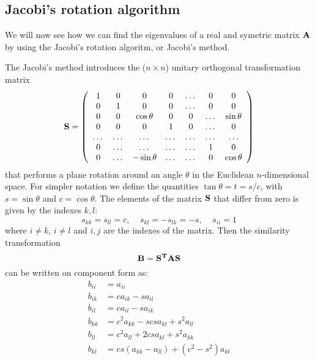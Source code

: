 \documentclass[11pt,a4wide]{article}
\begin{document}
\subsection{Jacobi's rotation algorithm} \label{sec:jacobi}
We will now see how we can find the eigenvalues of a real and symetric matrix $\bf A$ by using the Jacobi's rotation algoritm, or Jacobi's method.

The Jacobi's method introduces the ($n\times n$) unitary orthogonal transformation matrix 
\begin{equation}
    \bf S = \left( \begin{array}{ccccccc} 1 & 0 & 0   & 0    & \dots  &0     & 0 \\
                                0  & 1 & 0 & 0    & \dots  &0     &0 \\
                                0   & 0 & \cos \theta & 0  &0       &\dots & \sin \theta\\
                                0   & 0 & 0  & 1  &0       &\dots & 0\\
                                \dots  & \dots & \dots & \dots  &\dots      &\dots & \dots\\
                                0   & \dots & \dots & \dots  &\dots       &1 & 0\\
                                0   & \dots & -\sin \theta & \dots  &\dots       &0 & \cos \theta

             \end{array} \right) 
      \label{eq:sematrix}
\end{equation}
that performs a plane rotation around an angle $\theta$ in the Euclidean $n$-dimensional space. For simpler notation we define the quantities $\tan\theta = t= s/c$, with $s=\sin\theta$ and $c=\cos\theta$. The elements of the matrix $\bf S$ that differ from zero is given by the indexes $k,l$:
\[
s_{kk} = s_{ll} = c, \;\;\;\;  s_{kl} = -s_{lk} = -s,\;\; \;\;  s_{ii} = 1
\]
where $i\neq k$, $i\neq l$ and $i,j$ are the indexes of the matrix. Then the similarity transformation 
\[
\bf B = \bf {S^T AS}
\]
can be written on component form as:
\begin{align*}
b_{ii} &= a_{ii}\\
b_{ik} &= ca_{ik} - sa_{il} \\
b_{il} &= ca_{il} - sa_{ik} \\
b_{kk} &= c^2a_{kk} - s csa_{kl} + s^2 a_{ll} \\
b_{ll} &= c^2a_{ll} + 2csa_{kl} + s^2a_{kk} \\
b_{kl} &= cs(a_{kk} - a_{ll}) + (c^2 - s^2)a_{kl}
\end{align*}
\end{document}
